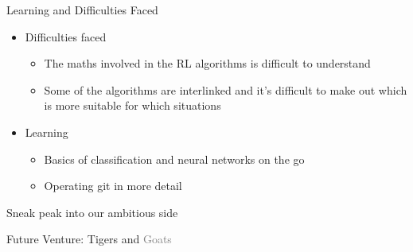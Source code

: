\documentclass[14pt]{beamer}
\begin{document}
\begin{frame}{Learning and Difficulties Faced}
    \begin{itemize}
        \item Difficulties faced
            \begin{itemize}
                \item The maths involved in the RL algorithms is difficult to understand
                \item Some of the algorithms are interlinked and it's difficult to make out which is more suitable for which situations
            \end{itemize}
        \item Learning
            \begin{itemize}
            \item Basics of classification and neural networks on the go
            \item Operating git in more detail
            \end{itemize}
    \end{itemize}
\end{frame}

\begin{frame}{Sneak peak into our ambitious side}
    \begin{center}
        Future Venture: \textcolor{myAmber}{Tigers} and \textcolor{gray}{Goats}
    \end{center}
\end{frame}
\end{document}
